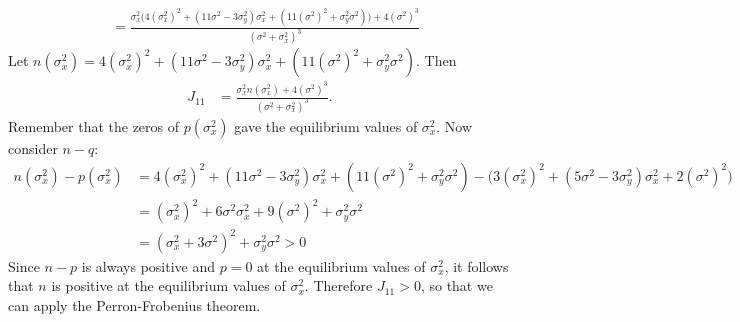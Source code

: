 \documentclass{article}
\begin{document}
\begin{enumerate}
\begin{align*}
\\&=\frac{\sigma_x^2\big(4(\sigma_x^2)^2+(11\sigma^2-3\sigma_y^2)\sigma_x^2+(11(\sigma^2)^2+\sigma_y^2\sigma^2)\big)+4(\sigma^2)^3}{(\sigma^2+\sigma_x^2)^3}
\end{align*}
Let
$n(\sigma_x^2)=4(\sigma_x^2)^2+(11\sigma^2-3\sigma_y^2)\sigma_x^2+(11(\sigma^2)^2+\sigma_y^2\sigma^2)$. Then 
\begin{align*}
J_{11}&=\frac{\sigma_x^2n(\sigma_x^2)+4(\sigma^2)^3}{(\sigma^2+\sigma_x^2)^3}.
\end{align*}
Remember that the zeros of $p(\sigma_x^2)$ gave the equilibrium values of $\sigma_x^2$. Now consider $n-q:$
\begin{align*}
n(\sigma_x^2)-p(\sigma_x^2)&=4(\sigma_x^2)^2+(11\sigma^2-3\sigma_y^2)\sigma_x^2+(11(\sigma^2)^2+\sigma_y^2\sigma^2)-\big(3(\sigma_x^2)^2+(5\sigma^2-3\sigma_y^2)\sigma_x^2+2(\sigma^2)^2\big)
\\&=(\sigma_x^2)^2+6\sigma^2\sigma_x^2+9(\sigma^2)^2+\sigma_y^2\sigma^2
\\&=(\sigma_x^2+3\sigma^2)^2+\sigma_y^2\sigma^2>0
\end{align*}
Since $n-p$ is always positive and $p=0$ at the equilibrium values of $\sigma_x^2$, it follows that $n$ is positive at the equilibrium values of $\sigma_x^2$. Therefore $J_{11}>0$, so that we can apply the Perron-Frobenius theorem.


\end{enumerate}
\end{document}
